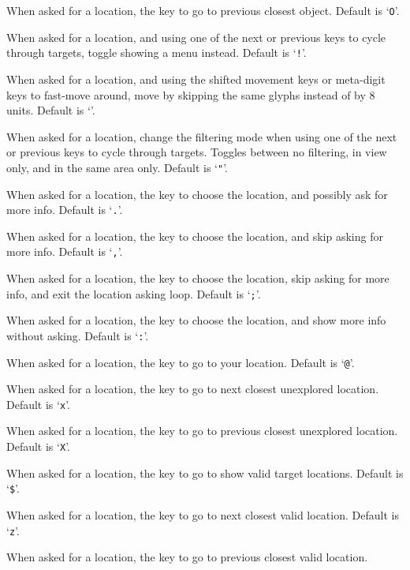 When asked for a location, the key to go to previous closest object.
Default is `{\tt O}'.
\item{}
When asked for a location, and using one of the next or previous keys to
cycle through targets, toggle showing a menu instead. Default is `{\tt !}'.
\item{}
When asked for a location, and using the shifted movement keys or
meta-digit keys to fast-move around, move by skipping the same glyphs
instead of by 8 units.
Default is `{\tt *}'.
\item{}
When asked for a location, change the filtering mode when using one of
the next or previous keys to cycle through targets. Toggles between no
filtering, in view only, and in the same area only. Default is `{\tt "}'.
\item{}
When asked for a location, the key to choose the location, and possibly
ask for more info. Default is `{\tt .}'.
\item{}
When asked for a location, the key to choose the location, and skip
asking for more info. Default is `{\tt ,}'.
\item{}
When asked for a location, the key to choose the location, skip asking
for more info, and exit the location asking loop. Default is `{\tt ;}'.
\item{}
When asked for a location, the key to choose the location, and show more
info without asking. Default is `{\tt :}'.
\item{}
When asked for a location, the key to go to your location.
Default is `{\tt @}'.
\item{}
When asked for a location, the key to go to next closest unexplored location.
Default is `{\tt x}'.
\item{}
When asked for a location, the key to go to previous closest unexplored
location. Default is `{\tt X}'.
\item{}
When asked for a location, the key to go to show valid target locations.
Default is `{\tt \$}'.
\item{}
When asked for a location, the key to go to next closest valid location.
Default is `{\tt z}'.
\item{}
When asked for a location, the key to go to previous closest valid location.
